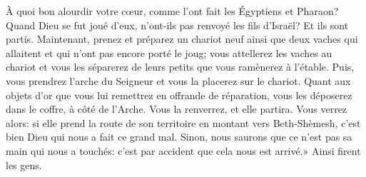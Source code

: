 À quoi bon alourdir votre cœur, comme l’ont fait les Égyptiens et Pharaon?
Quand Dieu se fut joué d’eux, n’ont-ils pas renvoyé les fils d’Israël?
Et ils sont partis.
Maintenant, prenez et préparez un chariot neuf
	ainsi que deux vaches qui allaitent et qui n’ont pas encore porté le joug;
	vous attellerez les vaches au chariot
	et vous les séparerez de leurs petits que vous ramènerez à l’étable.
Puis, vous prendrez l’arche du Seigneur et vous la placerez sur le chariot.
Quant aux objets d’or que vous lui remettrez en offrande de réparation,
	vous les déposerez dans le coffre, à côté de l’Arche.
Vous la renverrez, et elle partira.
Vous verrez alors: si elle prend la route de son territoire en montant vers Beth-Shèmesh,
	c’est bien Dieu qui nous a fait ce grand mal.
Sinon, nous saurons que ce n’est pas sa main qui nous a touchés:
	c’est par accident que cela nous est arrivé.»
Ainsi firent les gens.

